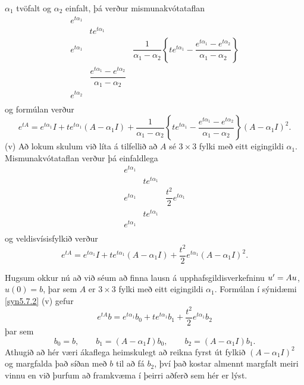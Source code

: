 \begin{sy}
$\alpha_1$ tvöfalt og $\alpha_2$ einfalt, þá verður
mismunakvótataflan 
 $$\begin{matrix}
e^{t\alpha_1}\\
&te^{t\alpha_1}\\
e^{t\alpha_1}& 
&\dfrac1{\alpha_1-\alpha_2}\left\{te^{t\alpha_1}-
\dfrac{e^{t\alpha_1}-e^{t\alpha_2}}{\alpha_1-\alpha_2}\right\}\\ 
&\dfrac{e^{t\alpha_1}-e^{t\alpha_2}}{\alpha_1-\alpha_2}\\
e^{t\alpha_2}\\
\end{matrix}
 $$
og formúlan verður
 $$e^{tA}=e^{t\alpha_1}I+te^{t\alpha_1}(A-\alpha_1I)+
\dfrac1{\alpha_1-\alpha_2}\left\{te^{t\alpha_1}-
\dfrac{e^{t\alpha_1}-e^{t\alpha_2}}{\alpha_1-\alpha_2}\right\}
(A-\alpha_1I)^2.
 $$
(v) Að lokum skulum við líta á tilfellið að $A$ sé $3\times 3$ fylki
með eitt eigingildi $\alpha_1$.  Mismunakvótataflan verður þá
einfaldlega
 $$\begin{matrix}
e^{t\alpha_1}\\
&te^{t\alpha_1}\\
e^{t\alpha_1}& 
&\dfrac{t^2}{2}e^{t\alpha_1}\\ 
&te^{t\alpha_1}\\
e^{t\alpha_1}\\
\end{matrix}
 $$
og veldisvísisfylkið verður
$$e^{tA}=e^{t\alpha_1}I+te^{t\alpha_1}(A-\alpha_1I)+
\dfrac{t^2}2e^{t\alpha_1}(A-\alpha_1I)^2.
 $$
\end{sy}


Hugsum okkur nú að við séum að finna lausn á
upphafsgildisverkefninu $u{\sp{\prime}}=Au$, $u(0)=b$, þar sem $A$ er
$3\times 3$ fylki með eitt eigingildi $\alpha_1$.  Formúlan í
sýnidæmi \ref{syn5.7.2} (v) gefur
 $$e^{tA}b=e^{t\alpha_1}b_0+te^{t\alpha_1}b_1+\dfrac {t^2}2e^{t\alpha_1}b_2
 $$
þar sem 
 $$b_0=b, \qquad b_1=(A-\alpha_1I)b_0, \qquad b_2=(A-\alpha_1I)b_1.
 $$
Athugið að hér væri ákaflega heimskulegt að reikna fyrst út fylkið
$(A-\alpha_1I)^2$ og margfalda það síðan með $b$ til að fá $b_2$, því
það kostar almennt margfalt meiri vinnu en við þurfum að framkvæma í
þeirri aðferð sem hér er lýst.



